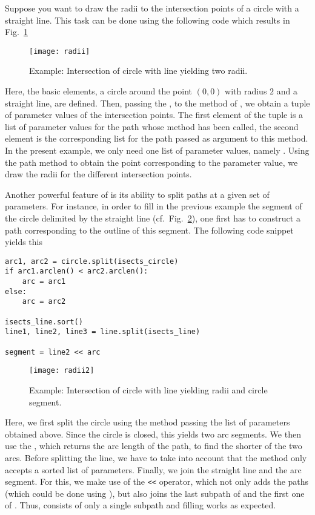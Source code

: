 Suppose you want to draw the radii to the intersection points of a
circle with a straight line. This task can be done using the following
code which results in Fig.~\ref{fig:radii}

\begin{figure}
\centerline{\texttt{[image: radii]}}
\caption{Example: Intersection of circle with line yielding two radii.}
\label{fig:radii}
\end{figure}
Here, the basic elements, a circle around the point $(0, 0)$ with
radius $2$ and a straight line, are defined. Then, passing the , to
the  method of , we obtain a tuple of
parameter values of the intersection points. The first element of the
tuple is a list of parameter values for the path whose
 method has been called, the second element is the
corresponding list for the path passed as argument to this method. In
the present example, we only need one list of parameter values, namely
.  Using the  path method to obtain
the point corresponding to the parameter value, we draw the radii for
the different intersection points. 

Another powerful feature of \PyX{} is its ability to split paths at a
given set of parameters. For instance, in order to fill in the
previous example the segment of the circle delimited by the straight
line (cf.\ Fig.~\ref{fig:radii2}), one first has to construct a path
corresponding to the outline of this segment. The following code
snippet yields this 
\begin{verbatim}
arc1, arc2 = circle.split(isects_circle)
if arc1.arclen() < arc2.arclen():
    arc = arc1
else:
    arc = arc2

isects_line.sort()
line1, line2, line3 = line.split(isects_line)

segment = line2 << arc
\end{verbatim}
\begin{figure}
\centerline{\texttt{[image: radii2]}}
\caption{Example: Intersection of circle with line yielding radii and
  circle segment.}
\label{fig:radii2}
\end{figure}
Here, we first split the circle using the  method passing
the list of parameters obtained above. Since the circle is closed,
this yields two arc segments. We then use the , which
returns the arc length of the path, to find the shorter of the two
arcs. Before splitting the line, we have to take into account that
the  method only accepts a sorted list of parameters.
Finally, we join the straight line and the arc segment. For
this, we make use of the \verb|<<| operator, which not only adds
the paths (which could be done using ), but also
joins the last subpath of  and the first one of
. Thus,  consists of only a single subpath
and filling works as expected.

